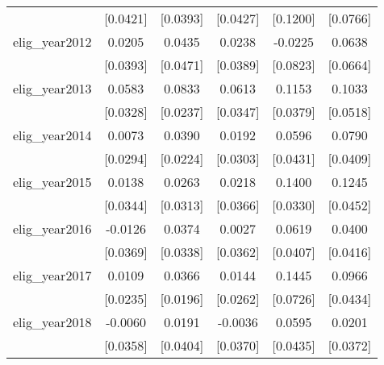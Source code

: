 \begin{table}[htbp]
\begin{tabular}{l*{5}{c}}
                    &    [0.0421]         &    [0.0393]         &    [0.0427]         &    [0.1200]         &    [0.0766]         \\
\addlinespace
elig\_year2012       &      0.0205         &      0.0435         &      0.0238         &     -0.0225         &      0.0638         \\
                    &    [0.0393]         &    [0.0471]         &    [0.0389]         &    [0.0823]         &    [0.0664]         \\
\addlinespace
elig\_year2013       &      0.0583\sym{*}  &      0.0833\sym{***}&      0.0613\sym{*}  &      0.1153\sym{***}&      0.1033\sym{*}  \\
                    &    [0.0328]         &    [0.0237]         &    [0.0347]         &    [0.0379]         &    [0.0518]         \\
\addlinespace
elig\_year2014       &      0.0073         &      0.0390         &      0.0192         &      0.0596         &      0.0790\sym{*}  \\
                    &    [0.0294]         &    [0.0224]         &    [0.0303]         &    [0.0431]         &    [0.0409]         \\
\addlinespace
elig\_year2015       &      0.0138         &      0.0263         &      0.0218         &      0.1400\sym{***}&      0.1245\sym{***}\\
                    &    [0.0344]         &    [0.0313]         &    [0.0366]         &    [0.0330]         &    [0.0452]         \\
\addlinespace
elig\_year2016       &     -0.0126         &      0.0374         &      0.0027         &      0.0619         &      0.0400         \\
                    &    [0.0369]         &    [0.0338]         &    [0.0362]         &    [0.0407]         &    [0.0416]         \\
\addlinespace
elig\_year2017       &      0.0109         &      0.0366\sym{*}  &      0.0144         &      0.1445\sym{*}  &      0.0966\sym{**} \\
                    &    [0.0235]         &    [0.0196]         &    [0.0262]         &    [0.0726]         &    [0.0434]         \\
\addlinespace
elig\_year2018       &     -0.0060         &      0.0191         &     -0.0036         &      0.0595         &      0.0201         \\
                    &    [0.0358]         &    [0.0404]         &    [0.0370]         &    [0.0435]         &    [0.0372]         \\

\end{tabular}
\end{table}
